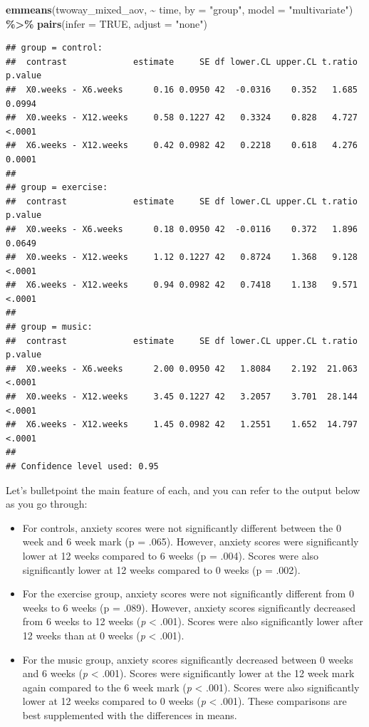 \documentclass[
]{book}
\newenvironment{Shaded}{\begin{snugshade}}{\end{snugshade}}
\newcommand{\AttributeTok}[1]{\textcolor[rgb]{0.13,0.29,0.53}{#1}}
\newcommand{\ConstantTok}[1]{\textcolor[rgb]{0.56,0.35,0.01}{#1}}
\newcommand{\FunctionTok}[1]{\textcolor[rgb]{0.13,0.29,0.53}{\textbf{#1}}}
\newcommand{\NormalTok}[1]{#1}
\newcommand{\SpecialCharTok}[1]{\textcolor[rgb]{0.81,0.36,0.00}{\textbf{#1}}}
\newcommand{\StringTok}[1]{\textcolor[rgb]{0.31,0.60,0.02}{#1}}
\providecommand{\tightlist}{%
  \setlength{\itemsep}{0pt}\setlength{\parskip}{0pt}}
\begin{document}
\begin{Shaded}
\begin{Highlighting}[]
\FunctionTok{emmeans}\NormalTok{(twoway\_mixed\_aov, }\SpecialCharTok{\textasciitilde{}}\NormalTok{ time, }\AttributeTok{by =} \StringTok{"group"}\NormalTok{, }\AttributeTok{model =} \StringTok{"multivariate"}\NormalTok{) }\SpecialCharTok{\%\textgreater{}\%}
  \FunctionTok{pairs}\NormalTok{(}\AttributeTok{infer =} \ConstantTok{TRUE}\NormalTok{, }\AttributeTok{adjust =} \StringTok{"none"}\NormalTok{)}
\end{Highlighting}
\end{Shaded}

\begin{verbatim}
## group = control:
##  contrast             estimate     SE df lower.CL upper.CL t.ratio p.value
##  X0.weeks - X6.weeks      0.16 0.0950 42  -0.0316    0.352   1.685  0.0994
##  X0.weeks - X12.weeks     0.58 0.1227 42   0.3324    0.828   4.727  <.0001
##  X6.weeks - X12.weeks     0.42 0.0982 42   0.2218    0.618   4.276  0.0001
## 
## group = exercise:
##  contrast             estimate     SE df lower.CL upper.CL t.ratio p.value
##  X0.weeks - X6.weeks      0.18 0.0950 42  -0.0116    0.372   1.896  0.0649
##  X0.weeks - X12.weeks     1.12 0.1227 42   0.8724    1.368   9.128  <.0001
##  X6.weeks - X12.weeks     0.94 0.0982 42   0.7418    1.138   9.571  <.0001
## 
## group = music:
##  contrast             estimate     SE df lower.CL upper.CL t.ratio p.value
##  X0.weeks - X6.weeks      2.00 0.0950 42   1.8084    2.192  21.063  <.0001
##  X0.weeks - X12.weeks     3.45 0.1227 42   3.2057    3.701  28.144  <.0001
##  X6.weeks - X12.weeks     1.45 0.0982 42   1.2551    1.652  14.797  <.0001
## 
## Confidence level used: 0.95
\end{verbatim}

Let's bulletpoint the main feature of each, and you can refer to the output below as you go through:

\begin{itemize}
\tightlist
\item
  For controls, anxiety scores were not significantly different between the 0 week and 6 week mark (p = .065). However, anxiety scores were significantly lower at 12 weeks compared to 6 weeks (p = .004). Scores were also significantly lower at 12 weeks compared to 0 weeks (p = .002).
\item
  For the exercise group, anxiety scores were not significantly different from 0 weeks to 6 weeks (p = .089). However, anxiety scores significantly decreased from 6 weeks to 12 weeks (\emph{p} \textless{} .001). Scores were also significantly lower after 12 weeks than at 0 weeks (\emph{p} \textless{} .001).
\item
  For the music group, anxiety scores significantly decreased between 0 weeks and 6 weeks (\emph{p} \textless{} .001). Scores were significantly lower at the 12 week mark again compared to the 6 week mark (\emph{p} \textless{} .001). Scores were also significantly lower at 12 weeks compared to 0 weeks (\emph{p} \textless{} .001). These comparisons are best supplemented with the differences in means.
\end{itemize}
\end{document}
